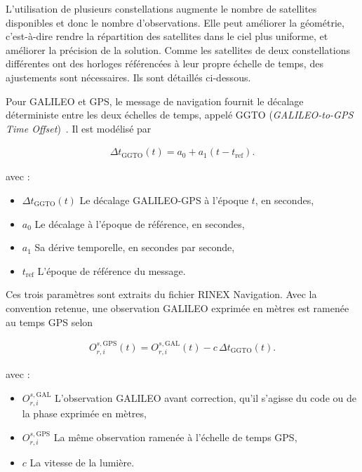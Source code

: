 L'utilisation de plusieurs constellations augmente le nombre de satellites
disponibles et donc le nombre d'observations. Elle peut améliorer la géométrie,
c'est-à-dire rendre la répartition des satellites dans le ciel plus uniforme,
et améliorer la précision de la solution.
Comme les satellites de deux constellations différentes ont des horloges
référencées à leur propre échelle de temps,
des ajustements sont nécessaires. Ils sont détaillés ci-dessous.

Pour GALILEO et GPS, le message de navigation fournit le décalage déterministe
entre les deux échelles de temps, appelé GGTO (\textit{GALILEO-to-GPS Time
Offset})~\cite{galileoOsSisIcd21}. Il est modélisé par

\begin{align}
\Delta t_{\mathrm{GGTO}}(t)
=
a_0+a_1\left(t-t_{\mathrm{ref}}\right).
\label{eq:ggto}
\end{align}

avec :

\begin{itemize}
    \item $\Delta t_{\mathrm{GGTO}}(t)$ Le décalage GALILEO-GPS à l'époque
    $t$, en secondes,
    \item $a_0$ Le décalage à l'époque de référence, en secondes,
    \item $a_1$ Sa dérive temporelle, en secondes par seconde,
    \item $t_{\mathrm{ref}}$ L'époque de référence du message.
\end{itemize}

Ces trois paramètres sont extraits du fichier RINEX Navigation.
Avec la convention retenue, une observation GALILEO
exprimée en mètres est ramenée au temps GPS selon

\begin{align}
O_{r,i}^{s,\mathrm{GPS}}(t)
=
O_{r,i}^{s,\mathrm{GAL}}(t)
-c\,\Delta t_{\mathrm{GGTO}}(t).
\label{eq:ggto_observation_correction}
\end{align}

avec :

\begin{itemize}
    \item $O_{r,i}^{s,\mathrm{GAL}}$ L'observation GALILEO avant correction,
    qu'il s'agisse du code ou de la phase exprimée en mètres,
    \item $O_{r,i}^{s,\mathrm{GPS}}$ La même observation ramenée à l'échelle
    de temps GPS,
    \item $c$ La vitesse de la lumière.
\end{itemize}

